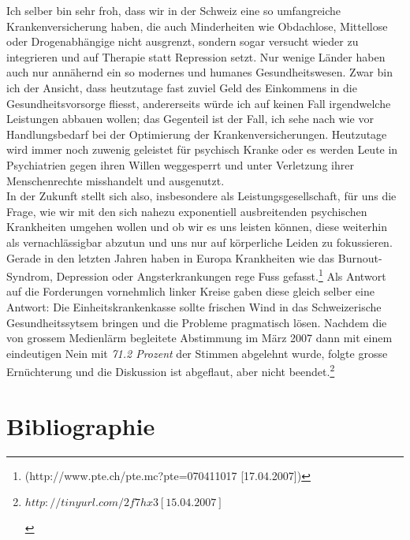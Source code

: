 \documentclass[a4paper,12pt]{book}
\begin{document}
Ich selber bin sehr froh, dass wir in der Schweiz eine so umfangreiche Krankenversicherung haben, die auch Minderheiten wie Obdachlose, Mittellose oder Drogenabhängige nicht ausgrenzt, sondern sogar versucht wieder zu integrieren und auf Therapie statt Repression setzt. Nur wenige Länder haben auch nur annähernd ein so modernes und humanes Gesundheitswesen. Zwar bin ich der Ansicht, dass heutzutage fast zuviel Geld des Einkommens in die Gesundheitsvorsorge fliesst, andererseits würde ich auf keinen Fall irgendwelche Leistungen abbauen wollen; das Gegenteil ist der Fall, ich sehe nach wie vor Handlungsbedarf bei der Optimierung der Krankenversicherungen. Heutzutage wird immer noch zuwenig geleistet für psychisch Kranke oder es werden Leute in Psychiatrien gegen ihren Willen weggesperrt und unter Verletzung ihrer Menschenrechte misshandelt und ausgenutzt. \\\newline In der Zukunft stellt sich also, insbesondere als Leistungsgesellschaft, für uns die Frage, wie wir mit den sich nahezu exponentiell ausbreitenden psychischen Krankheiten umgehen wollen und ob wir es uns leisten können, diese weiterhin als vernachlässigbar abzutun und uns nur auf körperliche Leiden zu fokussieren. Gerade in den letzten Jahren haben in Europa Krankheiten wie das Burnout-Syndrom, Depression oder Angsterkrankungen rege Fuss gefasst.\footnote{(http://www.pte.ch/pte.mc?pte=070411017 [17.04.2007])}
Als Antwort auf die Forderungen vornehmlich linker Kreise gaben diese gleich selber eine Antwort: Die Einheitskrankenkasse sollte frischen Wind in das Schweizerische Gesundheitssytsem bringen und die Probleme pragmatisch lösen.
Nachdem die von grossem Medienlärm begleitete Abstimmung im März 2007 dann mit einem eindeutigen Nein mit \emph{71.2 Prozent} der Stimmen abgelehnt wurde, folgte grosse Ernüchterung und die Diskussion ist abgeflaut, aber nicht beendet.\footnote{\begin{small}$http://tinyurl.com/2f7hx3 [15.04.2007]$
\end{small}}
\chapter{Bibliographie}
\end{document}
